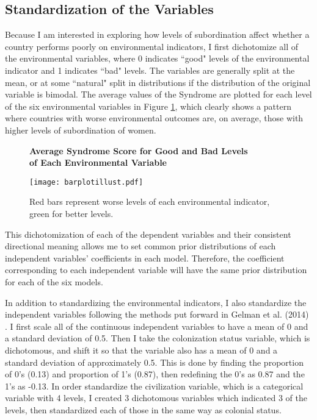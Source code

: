 \documentclass[letterpaper,10.5pt]{article}
\begin{document}
\subsection{Standardization of the Variables}

Because I am interested in exploring how levels of subordination affect whether a country performs poorly on environmental indicators, I first dichotomize all of the environmental variables, where 0 indicates ``good" levels of the environmental indicator and 1 indicates ``bad" levels. The variables are generally split at the mean, or at some ``natural" split in distributions if the distribution of the original variable is bimodal. The average values of the Syndrome are plotted for each level of the six environmental variables in Figure \ref{SynPerform}, which clearly shows a pattern where countries with worse environmental outcomes are, on average,  those with higher levels of subordination of women. 

\begin{figure}
  \centering
  \textbf{Average Syndrome Score for Good and Bad Levels \\ of Each Environmental Variable}\par\medskip
  \texttt{[image: barplotillust.pdf]}
  \caption{Red bars represent worse levels of each environmental indicator, green for better levels.}
  \label{SynPerform}
\end{figure}

This dichotomization of each of the dependent variables and their consistent directional meaning allows me to set common prior distributions of each independent variables' coefficients in each model. Therefore, the coefficient corresponding to each independent variable will have the same prior distribution for each of the six models.

In addition to standardizing the environmental indicators, I also standardize the independent variables following the methods put forward in Gelman et al. (2014) \cite{gelman}. I first scale all of the continuous independent variables to have a mean of 0 and a standard deviation of 0.5. Then I take the colonization status variable, which is dichotomous, and shift it so that the variable also has a mean of 0 and a standard deviation of approximately 0.5. This is done by finding the proportion of 0's (0.13) and proportion of 1's (0.87), then redefining the 0's as 0.87 and the 1's as -0.13. In order standardize the civilization variable, which is a categorical variable with 4 levels, I created 3 dichotomous variables which indicated 3 of the levels, then standardized each of those in the same way as colonial status.
\end{document}
